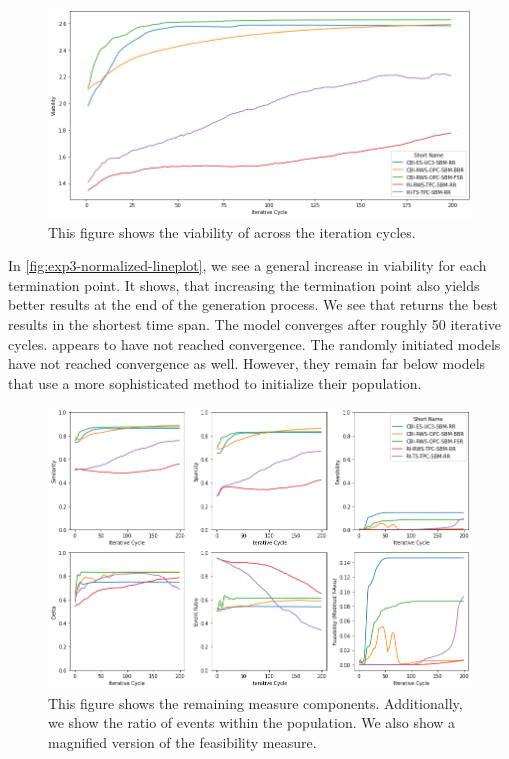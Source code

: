 \documentclass[./../../paper.tex]{subfiles}
\begin{document}

\begin{figure}[htbp]
    \centering
    \includegraphics[width=\textwidth]{figures/generated/exp3_relative_cycles.png}
    \caption{This figure shows the viability of across the iteration cycles.}
    \label{fig:exp3-normalized-lineplot}
\end{figure}

In \autoref{fig:exp3-normalized-lineplot}, we see a general increase in viability for each termination point. It shows, that increasing the termination point also yields better results at the end of the generation process. 
We see that  returns the best results in the shortest time span. The model converges after roughly 50 iterative cycles.  appears to have not reached convergence. 
The randomly initiated models have not reached convergence as well. However, they remain far below models that use a more sophisticated method to initialize their population. 

\begin{figure}[htbp]
    \centering
    \includegraphics[width=\textwidth]{figures/generated/exp3_cycles_components.png}
    \caption{This figure shows the remaining measure components. Additionally, we show the ratio of events within the population. We also show a magnified version of the feasibility measure.}
    \label{fig:exp3-components}
\end{figure}
\end{document}
